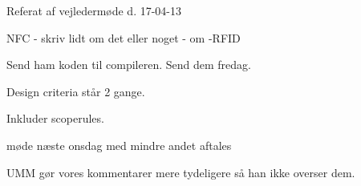Referat af vejledermøde d. 17-04-13

NFC - skriv lidt om det eller noget - om -RFID

Send ham koden til compileren. Send dem fredag.

Design criteria står 2 gange.

Inkluder scoperules.

møde næste onsdag med mindre andet aftales

UMM gør vores kommentarer mere tydeligere så han ikke overser dem.